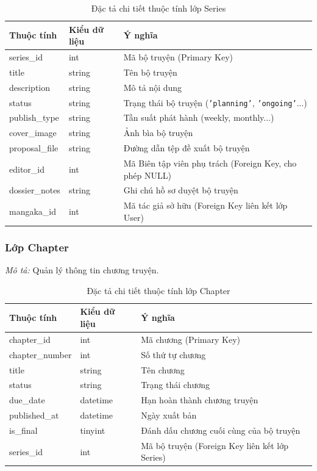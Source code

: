 \begin{table}[H]
\centering
\renewcommand{\arraystretch}{1.3}
\begin{tabularx}{\textwidth}{|p{4cm}|p{3cm}|>{\raggedright\arraybackslash}X|}
\hline
\rowcolor{tableheader}
\textbf{Thuộc tính} & \textbf{Kiểu dữ liệu} & \textbf{Ý nghĩa} \\ \hline
series\_id & int & Mã bộ truyện (Primary Key) \\ \hline
title & string & Tên bộ truyện \\ \hline
description & string & Mô tả nội dung \\ \hline
status & string & Trạng thái bộ truyện (\texttt{'planning'}, \texttt{'ongoing'}...) \\ \hline
publish\_type & string & Tần suất phát hành (weekly, monthly...) \\ \hline
cover\_image & string & Ảnh bìa bộ truyện \\ \hline
proposal\_file & string & Đường dẫn tệp đề xuất bộ truyện \\ \hline
editor\_id & int & Mã Biên tập viên phụ trách (Foreign Key, cho phép NULL) \\ \hline
dossier\_notes & string & Ghi chú hồ sơ duyệt bộ truyện \\ \hline
mangaka\_id & int & Mã tác giả sở hữu (Foreign Key liên kết lớp User) \\ \hline
\end{tabularx}
\caption{Đặc tả chi tiết thuộc tính lớp Series}
\label{tab:class_series}
\end{table}


\subsubsection{Lớp Chapter}
\textit{Mô tả:} Quản lý thông tin chương truyện.

\begin{table}[H]
\centering
\renewcommand{\arraystretch}{1.3}
\begin{tabularx}{\textwidth}{|p{4cm}|p{3cm}|>{\raggedright\arraybackslash}X|}
\hline
\rowcolor{tableheader}
\textbf{Thuộc tính} & \textbf{Kiểu dữ liệu} & \textbf{Ý nghĩa} \\ \hline
chapter\_id & int & Mã chương (Primary Key) \\ \hline
chapter\_number & int & Số thứ tự chương \\ \hline
title & string & Tên chương \\ \hline
status & string & Trạng thái chương \\ \hline
due\_date & datetime & Hạn hoàn thành chương truyện \\ \hline
published\_at & datetime & Ngày xuất bản \\ \hline
is\_final & tinyint & Đánh dấu chương cuối cùng của bộ truyện \\ \hline
series\_id & int & Mã bộ truyện (Foreign Key liên kết lớp Series) \\ \hline
\end{tabularx}
\caption{Đặc tả chi tiết thuộc tính lớp Chapter}
\label{tab:class_chapter}
\end{table}


